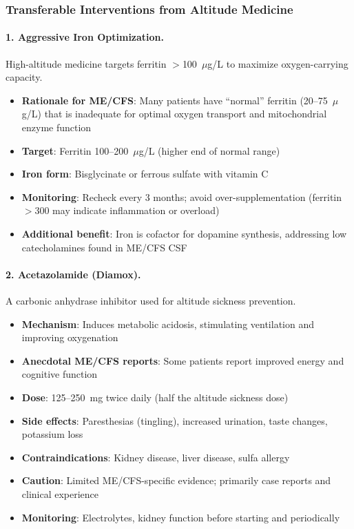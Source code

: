 \subsubsection{Transferable Interventions from Altitude Medicine}

\paragraph{1. Aggressive Iron Optimization.}
High-altitude medicine targets ferritin $>$100~$\mu$g/L to maximize oxygen-carrying capacity.

\begin{itemize}
    \item \textbf{Rationale for ME/CFS}: Many patients have ``normal'' ferritin (20--75~$\mu$g/L) that is inadequate for optimal oxygen transport and mitochondrial enzyme function
    \item \textbf{Target}: Ferritin 100--200~$\mu$g/L (higher end of normal range)
    \item \textbf{Iron form}: Bisglycinate or ferrous sulfate with vitamin C
    \item \textbf{Monitoring}: Recheck every 3 months; avoid over-supplementation (ferritin $>$300 may indicate inflammation or overload)
    \item \textbf{Additional benefit}: Iron is cofactor for dopamine synthesis, addressing low catecholamines found in ME/CFS CSF
\end{itemize}

\paragraph{2. Acetazolamide (Diamox).}
A carbonic anhydrase inhibitor used for altitude sickness prevention.

\begin{itemize}
    \item \textbf{Mechanism}: Induces metabolic acidosis, stimulating ventilation and improving oxygenation
    \item \textbf{Anecdotal ME/CFS reports}: Some patients report improved energy and cognitive function
    \item \textbf{Dose}: 125--250~mg twice daily (half the altitude sickness dose)
    \item \textbf{Side effects}: Paresthesias (tingling), increased urination, taste changes, potassium loss
    \item \textbf{Contraindications}: Kidney disease, liver disease, sulfa allergy
    \item \textbf{Caution}: Limited ME/CFS-specific evidence; primarily case reports and clinical experience
    \item \textbf{Monitoring}: Electrolytes, kidney function before starting and periodically
\end{itemize}

